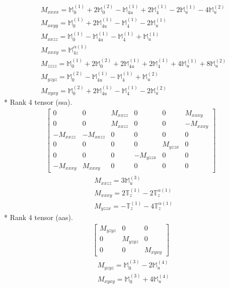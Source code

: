 \documentclass[fleqn,8pt,landscape]{jsarticle}
\begin{document}
\begin{align*}
& M_{xxxx} = \mathbb{M}_{0}^{(1)} + 2 \mathbb{M}_{0}^{(2)} - \mathbb{M}_{4u}^{(1)} + 2 \mathbb{M}_{4}^{(1)} - 2 \mathbb{M}_{u}^{(1)} - 4 \mathbb{M}_{u}^{(2)} \\
& M_{xxyy} = \mathbb{M}_{0}^{(1)} + 2 \mathbb{M}_{4u}^{(1)} - \mathbb{M}_{4}^{(1)} - 2 \mathbb{M}_{u}^{(1)} \\
& M_{xxzz} = \mathbb{M}_{0}^{(1)} - \mathbb{M}_{4u}^{(1)} - \mathbb{M}_{4}^{(1)} + \mathbb{M}_{u}^{(1)} \\
& M_{xxxy} = \mathbb{M}_{4z}^{\alpha(1)} \\
& M_{zzzz} = \mathbb{M}_{0}^{(1)} + 2 \mathbb{M}_{0}^{(2)} + 2 \mathbb{M}_{4u}^{(1)} + 2 \mathbb{M}_{4}^{(1)} + 4 \mathbb{M}_{u}^{(1)} + 8 \mathbb{M}_{u}^{(2)} \\
& M_{yzyz} = \mathbb{M}_{0}^{(2)} - \mathbb{M}_{4u}^{(1)} - \mathbb{M}_{4}^{(1)} + \mathbb{M}_{u}^{(2)} \\
& M_{xyxy} = \mathbb{M}_{0}^{(2)} + 2 \mathbb{M}_{4u}^{(1)} - \mathbb{M}_{4}^{(1)} - 2 \mathbb{M}_{u}^{(2)}
\end{align*}
* Rank 4 tensor (ssa).
\begin{align*}
\begin{bmatrix} 0 & 0 & M_{xxzz} & 0 & 0 & M_{xxxy} \\ 0 & 0 & M_{xxzz} & 0 & 0 & - M_{xxxy} \\ - M_{xxzz} & - M_{xxzz} & 0 & 0 & 0 & 0 \\ 0 & 0 & 0 & 0 & M_{yzzx} & 0 \\ 0 & 0 & 0 & - M_{yzzx} & 0 & 0 \\ - M_{xxxy} & M_{xxxy} & 0 & 0 & 0 & 0 \end{bmatrix}
\end{align*}
\begin{align*}
& M_{xxzz} = 3 \mathbb{M}_{u}^{(3)} \\
& M_{xxxy} = 2 \mathbb{T}_{z}^{(1)} - 2 \mathbb{T}_{z}^{\alpha(1)} \\
& M_{yzzx} = - \mathbb{T}_{z}^{(1)} - 4 \mathbb{T}_{z}^{\alpha(1)}
\end{align*}
* Rank 4 tensor (aas).
\begin{align*}
\begin{bmatrix} M_{yzyz} & 0 & 0 \\ 0 & M_{yzyz} & 0 \\ 0 & 0 & M_{xyxy} \end{bmatrix}
\end{align*}
\begin{align*}
& M_{yzyz} = \mathbb{M}_{0}^{(3)} - 2 \mathbb{M}_{u}^{(4)} \\
& M_{xyxy} = \mathbb{M}_{0}^{(3)} + 4 \mathbb{M}_{u}^{(4)}
\end{align*}
\end{document}
